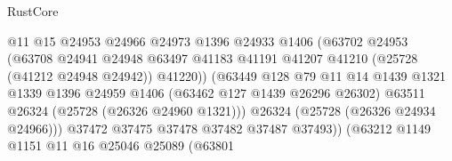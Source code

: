 \begin{lexlean}{RustCore}
\begin{coremodule}
                                          @11
                                          @15
                                          @24953
                                          @24966
                                          @24973
                                          @1396
                                          @24933
                                          @1406
                                          (@63702
                                            @24953
                                            (@63708
                                              @24941
                                              @24948
                                              @63497
                                              @41183
                                              @41191
                                              @41207
                                              @41210
                                              (@25728 (@41212 @24948 @24942))
                                              @41220))
                                          (@63449
                                            @128
                                            @79
                                            @11
                                            @14
                                            @1439
                                            @1321
                                            @1339
                                            @1396
                                            @24959
                                            @1406
                                            (@63462 @127 @1439 @26296 @26302)
                                            @63511
                                            @26324
                                            (@25728 (@26326 @24960 @1321)))
                                          @26324
                                          (@25728 (@26326 @24934 @24966)))
                                        @37472
                                        @37475
                                        @37478
                                        @37482
                                        @37487
                                        @37493))
                                    (@63212
                                      @1149
                                      @1151
                                      @11
                                      @16
                                      @25046
                                      @25089
                                      (@63801

\end{coremodule}
\end{lexlean}
